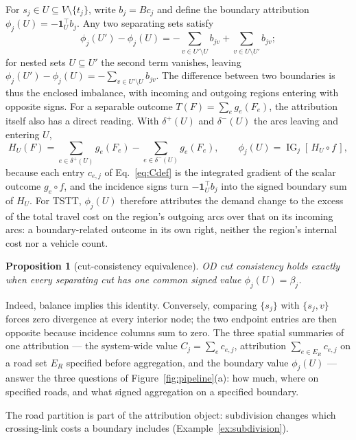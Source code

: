 \documentclass[a4paper,fleqn]{cas-sc}
\newtheorem*{uproposition}{Proposition}
\begin{document}
For $s_j\in U\subseteq V\setminus\{t_j\}$, write $b_j=Bc_j$ and define
the boundary attribution $\phi_j(U)=-\mathbf1_U^\top b_j$. Any two
separating sets satisfy
\begin{equation}
\phi_j(U')-\phi_j(U)
=-\sum_{v\in U'\setminus U}b_{jv}
+\sum_{v\in U\setminus U'}b_{jv};
\label{eq:cutdiff}
\end{equation}
for nested sets $U\subseteq U'$ the second term vanishes, leaving
$\phi_j(U')-\phi_j(U)=-\sum_{v\in U'\setminus U}b_{jv}$.
The difference between two boundaries is thus the enclosed imbalance,
with incoming and outgoing regions entering with opposite signs.
For a separable outcome $T(F)=\sum_e g_e(F_e)$, the attribution itself
also has a direct reading. With $\delta^+(U)$ and $\delta^-(U)$ the
arcs leaving and entering $U$,
\begin{equation}
H_U(F)=\sum_{e\in\delta^+(U)}g_e(F_e)-\sum_{e\in\delta^-(U)}g_e(F_e),
\qquad
\phi_j(U)=\operatorname{IG}_j[\,H_U\circ f\,],
\label{eq:hboundary}
\end{equation}
because each entry $c_{e,j}$ of Eq.~\eqref{eq:Cdef} is the
integrated gradient of the scalar outcome $g_e\circ f$, and the
incidence signs turn $-\mathbf 1_U^\top b_j$ into the
signed boundary sum of $H_U$. For TSTT, $\phi_j(U)$ therefore
attributes the demand change to the excess of the total travel cost on
the region's outgoing arcs over that on its incoming arcs: a
boundary-related outcome in its own right, neither the region's
internal cost nor a vehicle count.
\begin{uproposition}[cut-consistency equivalence]\label{par:cutequiv}
OD cut consistency holds exactly when every separating cut has one common
signed value $\phi_j(U)=\beta_j$.
\end{uproposition}
Indeed, balance implies this identity. Conversely, comparing $\{s_j\}$
with $\{s_j,v\}$ forces zero divergence at every interior node; the two
endpoint entries are then opposite because incidence columns sum to zero.
The three spatial summaries of one attribution --- the system-wide value
$C_j=\sum_ec_{e,j}$, attribution $\sum_{e\in E_R}c_{e,j}$ on a road set
$E_R$ specified before aggregation, and the boundary value $\phi_j(U)$
--- answer the three questions of Figure~\ref{fig:pipeline}(a): how
much, where on specified roads, and what signed aggregation on a
specified boundary.

The road partition is part of the attribution object: subdivision changes
which crossing-link costs a boundary includes (Example~\ref{ex:subdivision}).
\end{document}
